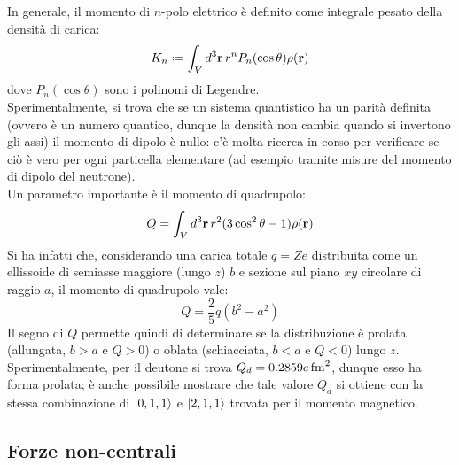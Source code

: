 In generale, il momento di $ n $-polo elettrico è definito come integrale pesato della densità di carica:
\begin{equation}
	K_n \defeq \int_V d^3\ve{r} \, r^n P_n(\cos \theta) \rho(\ve{r})
	\label{eq:4.16}
\end{equation}
dove $ P_n(\cos \theta) $ sono i polinomi di Legendre.\\
Sperimentalmente, si trova che se un sistema quantistico ha un parità definita (ovvero è un numero quantico, dunque la densità non cambia quando si invertono gli assi) il momento di dipolo è nullo: c'è molta ricerca in corso per verificare se ciò è vero per ogni particella elementare (ad esempio tramite misure del momento di dipolo del neutrone).\\
Un parametro importante è il momento di quadrupolo:
\begin{equation}
	Q = \int_V d^3\mathbf{r} \, r^2 (3\cos^2 \theta - 1) \rho(\mathbf{r})
	\label{eq:4.17}
\end{equation}
Si ha infatti che, considerando una carica totale $ q = Ze $ distribuita come un ellissoide di semiasse maggiore (lungo $ z $) $ b $ e sezione sul piano $ xy $ circolare di raggio $ a $, il momento di quadrupolo vale:
\begin{equation}
	Q = \frac{2}{5} q (b^2 - a^2)
	\label{eq:4.18}
\end{equation}
Il segno di $ Q $ permette quindi di determinare se la distribuzione è prolata (allungata, $ b > a $ e $ Q > 0 $) o oblata (schiacciata, $ b < a $ e $ Q < 0 $) lungo $ z $. Sperimentalmente, per il deutone si trova $ Q_d = 0.2859 e\,\mathrm{fm}^2 $, dunque esso ha forma prolata; è anche possibile mostrare che tale valore $ Q_d $ si ottiene con la stessa combinazione di $ \ket{0,1,1} $ e $ \ket{2,1,1} $ trovata per il momento magnetico.

\subsection{Forze non-centrali}


